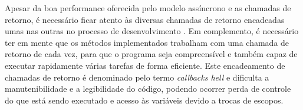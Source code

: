   
  

 

  
  Apesar da boa performance oferecida pelo modelo assíncrono e as chamadas de retorno, é necessário ficar
  atento às diversas chamadas de retorno encadeadas umas nas outras no processo de desenvolvimento \cite{pereira}. 
  Em complemento, é necessário ter em mente que os métodos implementados trabalham com uma 
  chamada de retorno de cada vez, para que o programa seja compreensível e também capaz de executar rapidamente várias 
  tarefas de forma eficiente\cite{hughes}. Este encadeamento de chamadas de retorno é denominado pelo termo \textit{callbacks hell} 
  e dificulta a manutenibilidade e a legibilidade do código, podendo ocorrer perda de controle do que está sendo executado e acesso às 
  variáveis devido a trocas de escopos. \cite{pereira}
  

